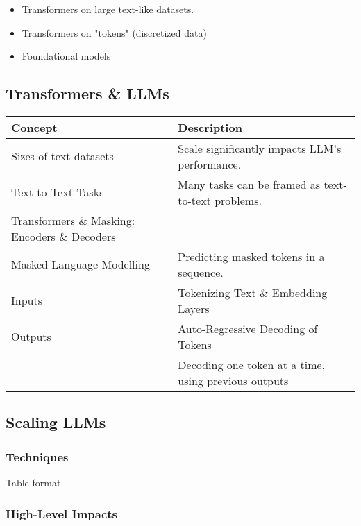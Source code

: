 \begin{notes}
    \begin{itemize}
        \item Transformers on large text-like datasets.
        \item Transformers on "tokens" (discretized data)
        \item Foundational models
    \end{itemize}
\end{notes}

\subsection{Transformers \& LLMs}
\begin{summary}
    \begin{center}
        \begin{tabular}{ll}
            \toprule
            \textbf{Concept} & \textbf{Description} \\
            \midrule
            Sizes of text datasets & Scale significantly impacts LLM's performance. \\
            \midrule
            Text to Text Tasks & Many tasks can be framed as text-to-text problems. \\
            \midrule
            Transformers \& Masking: Encoders \& Decoders & \\
            \midrule 
            Masked Language Modelling & Predicting masked tokens in a sequence. \\
            \midrule
            Inputs & Tokenizing Text \& Embedding Layers \\
            \midrule
            Outputs & Auto-Regressive Decoding of Tokens \\
            & Decoding one token at a time, using previous outputs \\
        \end{tabular}
    \end{center}
\end{summary}
\newpage

\subsection{Scaling LLMs}
\begin{motivation}
    
\end{motivation}

\subsubsection{Techniques}
\begin{summary}
    Table format
\end{summary}

\subsubsection{High-Level Impacts}
\begin{summary}

\end{summary}